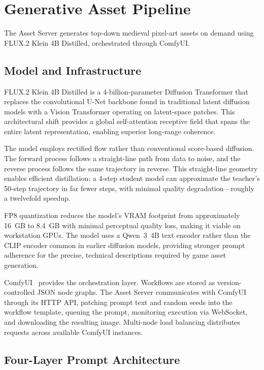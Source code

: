 \documentclass[conference]{IEEEtran}
\begin{document}
\FloatBarrier
\section{Generative Asset Pipeline}
\label{sec:assets}

The Asset Server generates top-down medieval pixel-art assets on demand
using FLUX.2 Klein 4B Distilled, orchestrated through ComfyUI.

\subsection{Model and Infrastructure}

FLUX.2 Klein 4B Distilled is a 4-billion-parameter Diffusion Transformer
that replaces the convolutional U-Net backbone found in traditional latent
diffusion models with a Vision Transformer operating on latent-space
patches. This architectural shift provides a global self-attention
receptive field that spans the entire latent representation, enabling
superior long-range coherence.

The model employs rectified flow rather than conventional score-based
diffusion. The forward process follows a straight-line path from data to
noise, and the reverse process follows the same trajectory in reverse.
This straight-line geometry enables efficient distillation: a 4-step
student model can approximate the teacher's 50-step trajectory in far
fewer steps, with minimal quality degradation---roughly a twelvefold
speedup.

FP8 quantization reduces the model's VRAM footprint from approximately
16~GB to 8.4~GB with minimal perceptual quality loss, making it viable on
workstation GPUs. The model uses a Qwen~3~4B text encoder rather than the
CLIP encoder common in earlier diffusion models, providing stronger prompt
adherence for the precise, technical descriptions required by game asset
generation.

ComfyUI~\cite{comfyui2023} provides the orchestration layer. Workflows are stored as
version-controlled JSON node graphs. The Asset Server communicates with
ComfyUI through its HTTP API, patching prompt text and random seeds into
the workflow template, queuing the prompt, monitoring execution via
WebSocket, and downloading the resulting image. Multi-node load balancing
distributes requests across available ComfyUI instances.

\subsection{Four-Layer Prompt Architecture}
\end{document}
